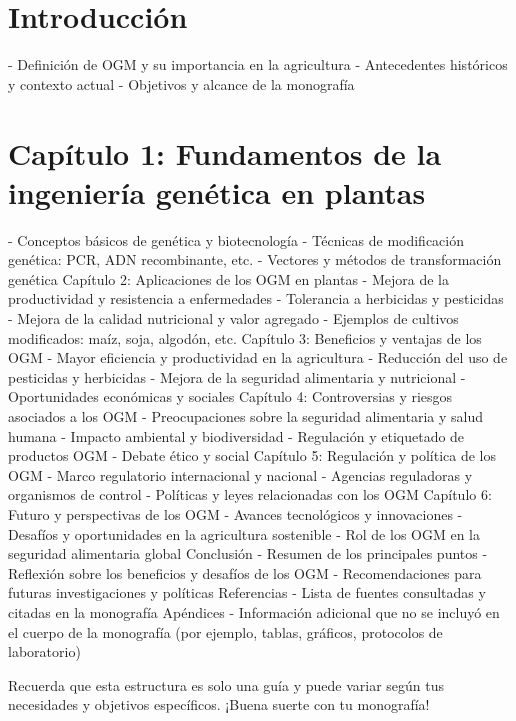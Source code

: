 \documentclass{article}
\begin{document}
\section{Introducción}

- Definición de OGM y su importancia en la agricultura
- Antecedentes históricos y contexto actual
- Objetivos y alcance de la monografía

\section{Capítulo 1: Fundamentos de la ingeniería genética en plantas}

- Conceptos básicos de genética y biotecnología
- Técnicas de modificación genética: PCR, ADN recombinante, etc.
- Vectores y métodos de transformación genética
Capítulo 2: Aplicaciones de los OGM en plantas
- Mejora de la productividad y resistencia a enfermedades
- Tolerancia a herbicidas y pesticidas
- Mejora de la calidad nutricional y valor agregado
- Ejemplos de cultivos modificados: maíz, soja, algodón, etc.
Capítulo 3: Beneficios y ventajas de los OGM
- Mayor eficiencia y productividad en la agricultura
- Reducción del uso de pesticidas y herbicidas
- Mejora de la seguridad alimentaria y nutricional
- Oportunidades económicas y sociales
Capítulo 4: Controversias y riesgos asociados a los OGM
- Preocupaciones sobre la seguridad alimentaria y salud humana
- Impacto ambiental y biodiversidad
- Regulación y etiquetado de productos OGM
- Debate ético y social
Capítulo 5: Regulación y política de los OGM
- Marco regulatorio internacional y nacional
- Agencias reguladoras y organismos de control
- Políticas y leyes relacionadas con los OGM
Capítulo 6: Futuro y perspectivas de los OGM
- Avances tecnológicos y innovaciones
- Desafíos y oportunidades en la agricultura sostenible
- Rol de los OGM en la seguridad alimentaria global
Conclusión
- Resumen de los principales puntos
- Reflexión sobre los beneficios y desafíos de los OGM
- Recomendaciones para futuras investigaciones y políticas
Referencias
- Lista de fuentes consultadas y citadas en la monografía
Apéndices
- Información adicional que no se incluyó en el cuerpo de la monografía (por ejemplo, tablas, gráficos, protocolos de laboratorio)

Recuerda que esta estructura es solo una guía y puede variar según tus necesidades y objetivos específicos. ¡Buena suerte con tu monografía!
\end{document}
